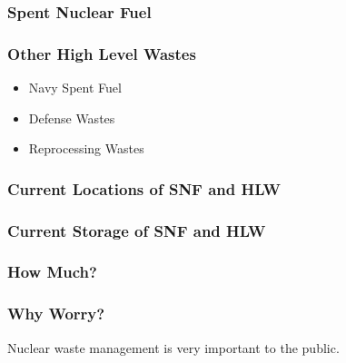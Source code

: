 
\begin{frame}[ctb!]
  \frametitle{Spent Nuclear Fuel}
  
\end{frame}

\begin{frame}[ctb!]
  \frametitle{Other High Level Wastes}
  \begin{itemize}
    \item Navy Spent Fuel
    \item Defense Wastes
    \item Reprocessing Wastes
  \end{itemize}
\end{frame}

\begin{frame}[ctb!]
  \frametitle{Current Locations of SNF and HLW}
  
\end{frame}

\begin{frame}[ctb!]
  \frametitle{Current Storage of SNF and HLW}
  
\end{frame}

\begin{frame}[ctb!]
  \frametitle{How Much?}
  
\end{frame}

\begin{frame}[ctb!]
  \frametitle{Why Worry?}
  Nuclear waste management is very important to the public.
\end{frame}

